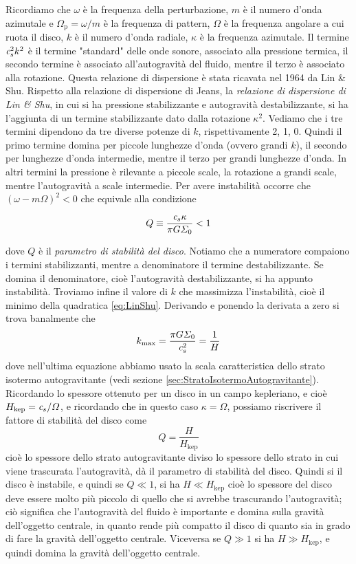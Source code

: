 Ricordiamo che $\omega$ è la frequenza della perturbazione, $m$ è il numero d'onda azimutale e $\Omega_\mathrm{p} = \omega /m$ è la frequenza di pattern, $\Omega$ è la frequenza angolare a cui ruota il disco, $k$ è il numero d'onda radiale, $\kappa$ è la frequenza azimutale. Il termine $\textit{c}_{s}^2k^2$ è il termine "standard" delle onde sonore, associato alla pressione termica, il secondo termine è associato all'autogravità del fluido, mentre il terzo è associato alla rotazione. Questa relazione di dispersione è stata ricavata nel 1964 da Lin \& Shu. Rispetto alla relazione di dispersione di Jeans, la \textit{relazione di dispersione di Lin \& Shu}, in cui si ha pressione stabilizzante e autogravità destabilizzante, si ha l'aggiunta di un termine stabilizzante dato dalla rotazione $\kappa^2$. Vediamo che i tre termini dipendono da tre diverse potenze di $k$, rispettivamente 2, 1, 0. Quindi il primo termine domina per piccole lunghezze d'onda (ovvero grandi $k$), il secondo per lunghezze d'onda intermedie, mentre il terzo per grandi lunghezze d'onda. In altri termini la pressione è rilevante a piccole scale, la rotazione a grandi scale, mentre l'autogravità a scale intermedie. Per avere instabilità occorre che $\left( \omega -m\Omega\right)^2  <0$ che equivale alla condizione
\begin{EQ}
\begin{equation}
Q \equiv \dfrac{\textit{c}_{s} \kappa}{\pi G \Sigma_0} <1
\end{equation}
\end{EQ}
dove $Q$ è il \textit{parametro di stabilità del disco}. Notiamo che a numeratore compaiono i termini stabilizzanti, mentre a denominatore il termine destabilizzante. Se domina il denominatore, cioè l'autogravità destabilizzante, si ha appunto instabilità. Troviamo infine il valore di $k$ che massimizza l'instabilità, cioè il minimo della quadratica \ref{eq:LinShu}. Derivando e ponendo la derivata a zero si trova banalmente che 
\begin{equation}
k_\mathrm{max} = \dfrac{\pi G \Sigma_0}{\textit{c}_{s}^2} = \dfrac{1}{H}
\end{equation}
dove nell'ultima equazione abbiamo usato la scala caratteristica dello strato isotermo autogravitante (vedi sezione \ref{sec:StratoIsotermoAutogravitante}). Ricordando lo spessore ottenuto per un disco in un campo kepleriano, e cioè $H_\mathrm{kep}=\textit{c}_{s}/\Omega$, e ricordando che in questo caso $\kappa=\Omega$, possiamo riscrivere il fattore di stabilità del disco come
\begin{equation}
Q=\dfrac{H}{H_\mathrm{kep}}
\end{equation}
cioè lo spessore dello strato autogravitante diviso lo spessore dello strato in cui viene trascurata l'autogravità, dà il parametro di stabilità del disco.
Quindi si il disco è instabile, e quindi se $Q\ll 1$, si ha $H\ll H_\mathrm{kep}$ cioè lo spessore del disco deve essere molto più piccolo di quello che si avrebbe trascurando l'autogravità; ciò significa che l'autogravità del fluido è importante e domina sulla gravità dell'oggetto centrale, in quanto rende più compatto il disco di quanto sia in grado di fare la gravità dell'oggetto centrale. Viceversa se $Q\gg 1$ si ha $H\gg H_\mathrm{kep}$, e quindi domina la gravità dell'oggetto centrale. 

